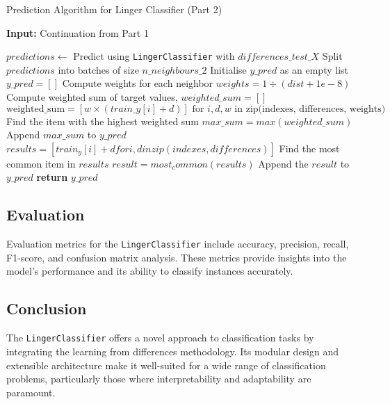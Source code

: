 \documentclass[a4paper, 12pt]{report}
\begin{document}
\begin{algorithm}[H]
    \caption{Prediction Algorithm for Linger Classifier (Part 2)}
    \textbf{Input:} Continuation from Part 1
    \label{alg:linger_classifier_predict_implementation_part2}
    \begin{algorithmic}[1]
            \State $predictions \gets$ Predict using \texttt{LingerClassifier} with $differences\_test\_X$
            \State Split $predictions$ into batches of size $n\_neighbours\_2$
            \State Initialise $y\_pred$ as an empty list 
            \State $y\_pred = []$
                    \State Compute weights for each neighbor
                    \State $weights = 1 \div (dist + 1e-8)$
                    \State Compute weighted sum of target values,
                    \State $weighted\_sum = []$
                    \State $\text{weighted\_sum} = \left[ w \times \left( train\_y[i] + d \right) \right] \text{ for } i, d, w \text{ in } \text{zip(indexes, differences, weights)}$
                    \State Find the item with the highest weighted sum
                    \State $max\_sum = max(weighted\_sum)$
                    \State Append $max\_sum$ to $y\_pred$
                \EndFor
            \Else
                    \State $results = [train_y[i] + d for i, d in zip(indexes, differences)]$
                    \State Find the most common item in $results$
                    \State $result = most_common(results)$
                    \State Append the $result$ to $y\_pred$
                \EndFor
            \EndIf
            \State \textbf{return} $y\_pred$
        \EndFunction
    \end{algorithmic}
\end{algorithm}
\subsection{Evaluation}
Evaluation metrics for the \texttt{LingerClassifier} include accuracy, precision, recall, F1-score, and confusion matrix analysis. 
These metrics provide insights into the model's performance and its ability to classify instances accurately.

\subsection{Conclusion}
The \texttt{LingerClassifier} offers a novel approach to classification tasks by integrating the learning from differences methodology. 
Its modular design and extensible architecture make it well-suited for a wide range of classification problems, particularly those where interpretability and adaptability are paramount.
\end{document}

